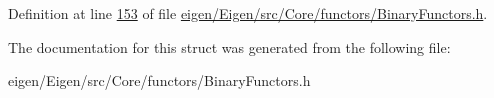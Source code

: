 Definition at line \hyperlink{eigen_2_eigen_2src_2_core_2functors_2_binary_functors_8h_source_l00153}{153} of file \hyperlink{eigen_2_eigen_2src_2_core_2functors_2_binary_functors_8h_source}{eigen/\+Eigen/src/\+Core/functors/\+Binary\+Functors.\+h}.



The documentation for this struct was generated from the following file\+:\begin{DoxyCompactItemize}
\item 
eigen/\+Eigen/src/\+Core/functors/\+Binary\+Functors.\+h\end{DoxyCompactItemize}
